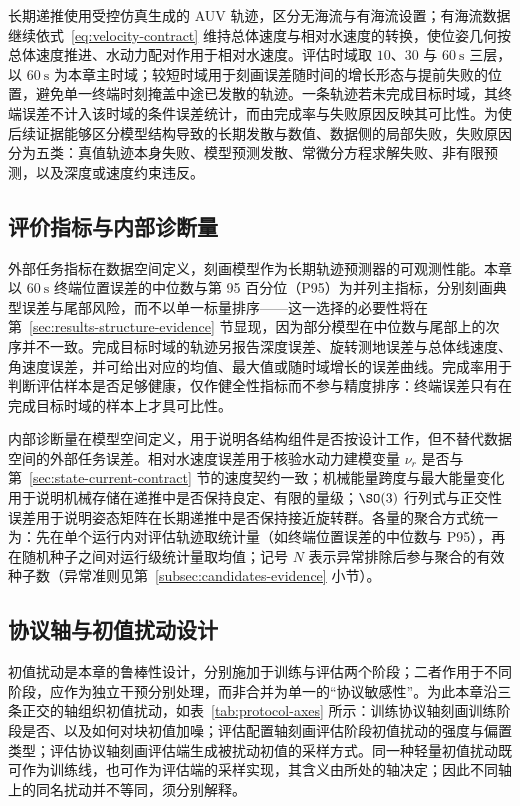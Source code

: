 长期递推使用受控仿真生成的 AUV 轨迹，区分无海流与有海流设置；有海流数据继续依式~\eqref{eq:velocity-contract} 维持总体速度与相对水速度的转换，使位姿几何按总体速度推进、水动力配对作用于相对水速度。评估时域取 \(10\)、\(30\) 与 \(60~\mathrm{s}\) 三层，以 \(60~\mathrm{s}\) 为本章主时域；较短时域用于刻画误差随时间的增长形态与提前失败的位置，避免单一终端时刻掩盖中途已发散的轨迹。一条轨迹若未完成目标时域，其终端误差不计入该时域的条件误差统计，而由完成率与失败原因反映其可比性。为使后续证据能够区分模型结构导致的长期发散与数值、数据侧的局部失败，失败原因分为五类：真值轨迹本身失败、模型预测发散、常微分方程求解失败、非有限预测，以及深度或速度约束违反。

\subsection{评价指标与内部诊断量}
\label{subsec:metrics}

外部任务指标在数据空间定义，刻画模型作为长期轨迹预测器的可观测性能。本章以 \(60~\mathrm{s}\) 终端位置误差的中位数与第 95 百分位（P95）为并列主指标，分别刻画典型误差与尾部风险，而不以单一标量排序——这一选择的必要性将在第~\ref{sec:results-structure-evidence} 节显现，因为部分模型在中位数与尾部上的次序并不一致。完成目标时域的轨迹另报告深度误差、旋转测地误差与总体线速度、角速度误差，并可给出对应的均值、最大值或随时域增长的误差曲线。完成率用于判断评估样本是否足够健康，仅作健全性指标而不参与精度排序：终端误差只有在完成目标时域的样本上才具可比性。

内部诊断量在模型空间定义，用于说明各结构组件是否按设计工作，但不替代数据空间的外部任务误差。相对水速度误差用于核验水动力建模变量 \(\nu_r\) 是否与第~\ref{sec:state-current-contract} 节的速度契约一致；机械能量跨度与最大能量变化用于说明机械存储在递推中是否保持良定、有限的量级；\(\SO(3)\) 行列式与正交性误差用于说明姿态矩阵在长期递推中是否保持接近旋转群。各量的聚合方式统一为：先在单个运行内对评估轨迹取统计量（如终端位置误差的中位数与 P95），再在随机种子之间对运行级统计量取均值；记号 \(N\) 表示异常排除后参与聚合的有效种子数（异常准则见第~\ref{subsec:candidates-evidence} 小节）。

\subsection{协议轴与初值扰动设计}
\label{subsec:protocol-axes}

初值扰动是本章的鲁棒性设计，分别施加于训练与评估两个阶段；二者作用于不同阶段，应作为独立干预分别处理，而非合并为单一的“协议敏感性”。为此本章沿三条正交的轴组织初值扰动，如表~\ref{tab:protocol-axes} 所示：训练协议轴刻画训练阶段是否、以及如何对块初值加噪；评估配置轴刻画评估阶段初值扰动的强度与偏置类型；评估协议轴刻画评估端生成被扰动初值的采样方式。同一种轻量初值扰动既可作为训练线，也可作为评估端的采样实现，其含义由所处的轴决定；因此不同轴上的同名扰动并不等同，须分别解释。

